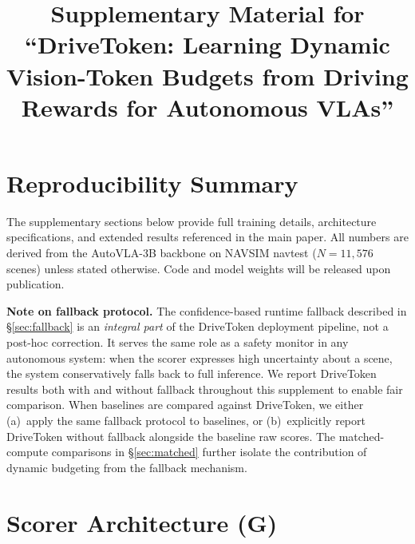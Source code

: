 \documentclass[letterpaper]{article}
\begin{document}
\title{Supplementary Material for ``DriveToken: Learning Dynamic Vision-Token Budgets from Driving Rewards for Autonomous VLAs''}

\maketitle

\section{Reproducibility Summary}

The supplementary sections below provide full training details, architecture specifications, and
extended results referenced in the main paper.  All numbers are derived from the AutoVLA-3B backbone
on NAVSIM navtest ($N{=}11{,}576$ scenes) unless stated otherwise.  Code and model weights will be
released upon publication.

\medskip
\noindent\textbf{Note on fallback protocol.}
The confidence-based runtime fallback described in \S\ref{sec:fallback} is an \emph{integral part}
of the DriveToken deployment pipeline, not a post-hoc correction. It serves the same role as a
safety monitor in any autonomous system: when the scorer expresses high uncertainty about a scene,
the system conservatively falls back to full inference. We report DriveToken results both with and
without fallback throughout this supplement to enable fair comparison. When baselines are compared
against DriveToken, we either (a)~apply the same fallback protocol to baselines, or (b)~explicitly
report DriveToken without fallback alongside the baseline raw scores. The matched-compute
comparisons in \S\ref{sec:matched} further isolate the contribution of dynamic budgeting from the
fallback mechanism.

\section{Scorer Architecture (G)}
\label{sec:arch}
\end{document}
